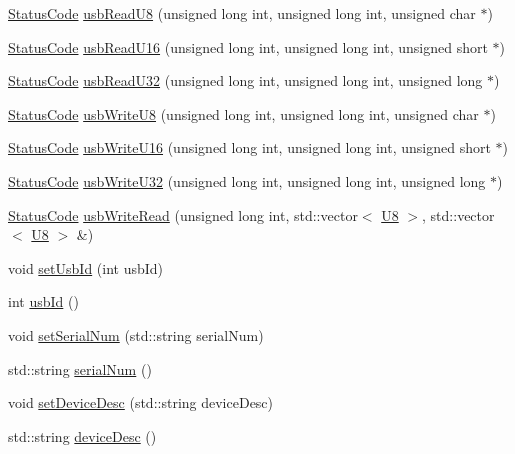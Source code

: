 \begin{DoxyCompactItemize}
\item 
\hyperlink{classStatusCode}{StatusCode} \hyperlink{classUsbFTMLInterface_ac356419a8bbaa26e63f182a86e5fd380}{usbReadU8} (unsigned long int, unsigned long int, unsigned char $\ast$)
\item 
\hyperlink{classStatusCode}{StatusCode} \hyperlink{classUsbFTMLInterface_a5fb608bce418671265b61266033cedc0}{usbReadU16} (unsigned long int, unsigned long int, unsigned short $\ast$)
\item 
\hyperlink{classStatusCode}{StatusCode} \hyperlink{classUsbFTMLInterface_aa1256fc56698bc9ed1bcf11ecc6ff766}{usbReadU32} (unsigned long int, unsigned long int, unsigned long $\ast$)
\item 
\hyperlink{classStatusCode}{StatusCode} \hyperlink{classUsbFTMLInterface_ae5cb7b250be9be23f90f455f57d41287}{usbWriteU8} (unsigned long int, unsigned long int, unsigned char $\ast$)
\item 
\hyperlink{classStatusCode}{StatusCode} \hyperlink{classUsbFTMLInterface_ab5c7e059f621774c6f51a1a7e9012aed}{usbWriteU16} (unsigned long int, unsigned long int, unsigned short $\ast$)
\item 
\hyperlink{classStatusCode}{StatusCode} \hyperlink{classUsbFTMLInterface_a79433fc9a3dd8c96519960cd55958fbf}{usbWriteU32} (unsigned long int, unsigned long int, unsigned long $\ast$)
\item 
\hyperlink{classStatusCode}{StatusCode} \hyperlink{classUsbFTMLInterface_ab3ae56cb732cbb8f38494cd3205a2650}{usbWriteRead} (unsigned long int, std::vector$<$ \hyperlink{classUsbFTMLInterface_af7c9f02ee6f59fefa68ef14f90dcbbd8}{U8} $>$, std::vector$<$ \hyperlink{classUsbFTMLInterface_af7c9f02ee6f59fefa68ef14f90dcbbd8}{U8} $>$ \&)
\item 
void \hyperlink{classUsbFTMLInterface_a00dc58835d65f98593e15287c1c8c6ab}{setUsbId} (int usbId)
\item 
int \hyperlink{classUsbFTMLInterface_a99016c7661780ed89195dc507d3516fc}{usbId} ()
\item 
void \hyperlink{classUsbFTMLInterface_a53fda4d42c82362f61544ba7c05beb8a}{setSerialNum} (std::string serialNum)
\item 
std::string \hyperlink{classUsbFTMLInterface_a6b005503472f0ff0357662555275cba4}{serialNum} ()
\item 
void \hyperlink{classUsbFTMLInterface_a8be842aa510ff8f915a9ad31f11154a0}{setDeviceDesc} (std::string deviceDesc)
\item 
std::string \hyperlink{classUsbFTMLInterface_ab541b4c57c1e7e947037acbfebc3fe3b}{deviceDesc} ()

\end{DoxyCompactItemize}
